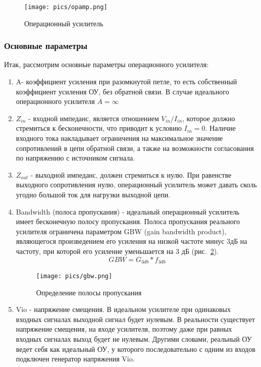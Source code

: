 \documentclass[a4paper,12pt,oneside]{scrartcl}
\begin{document}
\begin{figure}[!htb]
    \centering
    \texttt{[image: pics/opamp.png]}
    \caption{Операционный усилитель}
    \label{fig:opa}
\end{figure}
\FloatBarrier









\subsubsection{Основные параметры}\label{sec:Param}

Итак, рассмотрим основные параметры операционного усилителя:
\begin{enumerate}
    \item A- коэффициент усиления при разомкнутой петле, то есть собственный коэффициент усиления ОУ, без обратной связи. В случае идеального операционного усилителя $A = \infty$
    \item $Z_{in}$ - входной импеданс, является отношением $V_{in}/I_{in}$, которое должно стремиться к бесконечности, что приводит к условию $I_{in} = 0$. Наличие входного тока накладывает ограничения на максимальное значение сопротивлений в цепи обратной связи, а также на возможности согласования по напряжению с источником сигнала.
    \item $Z_{out}$ - выходной импеданс, должен стремиться к нулю. При равенстве выходного сопротивления нулю, операционный усилитель может давать сколь угодно большой ток для нагрузки выходной цепи.~\cite{B12}
    \item Bandwidth (полоса пропускания) - идеальный операционный усилитель имеет бесконечную полосу пропускания. Полоса пропускания реального усилителя ограничена параметром GBW (gain bandwidth product), являющегося произведением его усиления на низкой частоте минус 3дБ на частоту, при которой его усиление уменьшается на 3 дБ (рис.~\ref{fig:Gbw}).~\cite{B12} 
    $$GBW = G_{3db} * f_{3db}$$
    \begin{figure}[!htb]
    \centering
    \texttt{[image: pics/gbw.png]}
    \caption{Определение полосы пропускания}
    \label{fig:Gbw}
    \end{figure}
    
    \item Vio - напряжение смещения. В идеальном усилителе при одинаковых входных сигналах выходной сигнал будет нулевым. В реальности существует напряжение смещения, на входе усилителя, поэтому даже при равных входных сигналах выход будет не нулевым. Другими словами, реальный ОУ ведет себя как идеальный ОУ, у которого последовательно с одним из входов подключен генератор напряжения Vio.~\cite{B6}
    

\end{enumerate}
\end{document}
